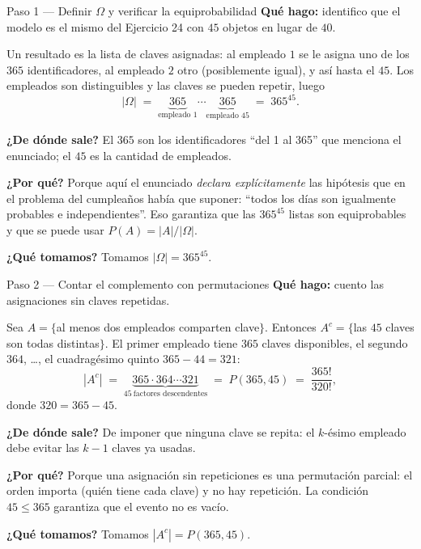 \documentclass[11pt]{article}
\begin{document}
\begin{sol}

\begin{paso}{Paso 1 --- Definir $\Omega$ y verificar la equiprobabilidad}
\textbf{Qu\'e hago:} identifico que el modelo es el mismo del Ejercicio 24 con $45$ objetos en lugar de $40$.

Un resultado es la lista de claves asignadas: al empleado $1$ se le asigna uno de los $365$ identificadores, al empleado $2$ otro (posiblemente igual), y as\'i hasta el $45$. Los empleados son distinguibles y las claves se pueden repetir, luego
\[
|\Omega| \;=\; \underbrace{365}_{\text{empleado 1}}\cdots\underbrace{365}_{\text{empleado 45}} \;=\; 365^{45}.
\]

\textbf{¿De d\'onde sale?} El $365$ son los identificadores ``del 1 al 365'' que menciona el enunciado; el $45$ es la cantidad de empleados.

\textbf{¿Por qu\'e?} Porque aqu\'i el enunciado \emph{declara expl\'icitamente} las hip\'otesis que en el problema del cumplea\~nos hab\'ia que suponer: ``todos los d\'ias son igualmente probables e independientes''. Eso garantiza que las $365^{45}$ listas son equiprobables y que se puede usar $P(A)=|A|/|\Omega|$.

\textbf{¿Qu\'e tomamos?} Tomamos $|\Omega|=365^{45}$.
\end{paso}

\begin{paso}{Paso 2 --- Contar el complemento con permutaciones}
\textbf{Qu\'e hago:} cuento las asignaciones sin claves repetidas.

Sea $A=\{$al menos dos empleados comparten clave$\}$. Entonces $A^{c}=\{$las $45$ claves son todas distintas$\}$. El primer empleado tiene $365$ claves disponibles, el segundo $364$, \dots, el cuadrag\'esimo quinto $365-44=321$:
\[
|A^{c}| \;=\; \underbrace{365\cdot 364\cdots 321}_{45\ \text{factores descendentes}}\;=\;P(365,45)\;=\;\frac{365!}{320!},
\]
donde $320=365-45$.

\textbf{¿De d\'onde sale?} De imponer que ninguna clave se repita: el $k$-\'esimo empleado debe evitar las $k-1$ claves ya usadas.

\textbf{¿Por qu\'e?} Porque una asignaci\'on sin repeticiones es una permutaci\'on parcial: el orden importa (qui\'en tiene cada clave) y no hay repetici\'on. La condici\'on $45\le 365$ garantiza que el evento no es vac\'io.

\textbf{¿Qu\'e tomamos?} Tomamos $|A^{c}|=P(365,45)$.
\end{paso}


\end{sol}
\end{document}
